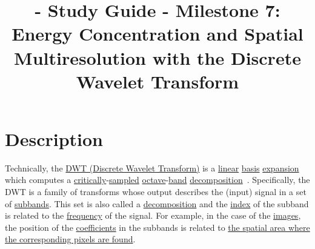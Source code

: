 
\title{\SM{} - Study Guide - Milestone 7: Energy Concentration and Spatial Multiresolution with the Discrete Wavelet Transform}

\maketitle

\section{Description}

Technically, the
\href{https://en.wikipedia.org/wiki/Discrete_wavelet_transform}{DWT
  (Discrete Wavelet Transform)} is a
\href{https://en.wikipedia.org/wiki/Linearity}{linear}
\href{https://en.wikipedia.org/wiki/Change_of_basis}{basis}
\href{https://www.youtube.com/watch?v=P2LTAUO1TdA}{expansion} which
computes a
\href{https://www.dsprelated.com/freebooks/sasp/Critically_Sampled_Perfect_Reconstruction.html}{critically}-\href{https://en.wikipedia.org/wiki/Nyquist-Shannon_sampling_theorem}{sampled}
\href{https://en.wikipedia.org/wiki/Octave_(electronics)}{octave}-\href{https://en.wikipedia.org/wiki/Frequency_band}{band}
\href{https://www.sciencedirect.com/topics/engineering/wavelet-decomposition}{decomposition}~\cite{vetterli2014foundations,kovacevic2013fourier}. Specifically,
the DWT is a family of transforms whose output describes the (input)
signal in a set of
\href{https://en.wikipedia.org/wiki/Sub-band_coding}{subbands}. This
set is also called
a \href{https://en.wikipedia.org/wiki/Discrete_wavelet_transform}{decomposition}
and the
\href{https://en.wikipedia.org/wiki/Array_data_structure#Element_identifier_and_addressing_formulas}{index}
of the subband is related to the
\href{https://en.wikipedia.org/wiki/Frequency}{frequency} of the
signal. For example, in the case of the
\href{https://en.wikipedia.org/wiki/Digital_image}{images}, the
position of the
\href{https://en.wikipedia.org/wiki/Coefficient}{coefficients} in the
subbands is related to
\href{https://en.wikipedia.org/wiki/Discrete_wavelet_transform#/media/File:Jpeg2000_2-level_wavelet_transform-lichtenstein.png}{the
  spatial area where the corresponding pixels are found}.


